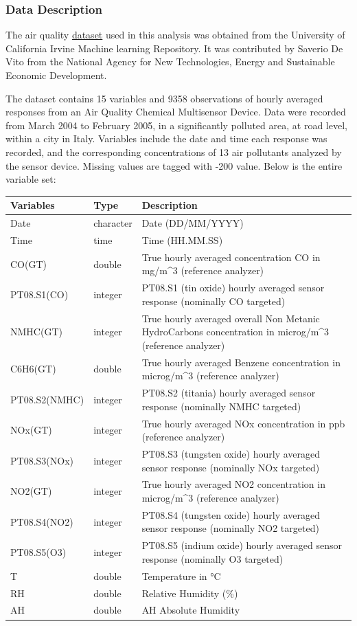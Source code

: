 \documentclass[]{article}
\begin{document}
\hypertarget{data-description}{%
\subsubsection{Data Description}\label{data-description}}

The air quality
\href{https://archive.ics.uci.edu/ml/datasets/Air+Quality}{dataset} used
in this analysis was obtained from the University of California Irvine
Machine learning Repository. It was contributed by Saverio De Vito from
the National Agency for New Technologies, Energy and Sustainable
Economic Development.

The dataset contains 15 variables and 9358 observations of hourly
averaged responses from an Air Quality Chemical Multisensor Device. Data
were recorded from March 2004 to February 2005, in a significantly
polluted area, at road level, within a city in Italy. Variables include
the date and time each response was recorded, and the corresponding
concentrations of 13 air pollutants analyzed by the sensor device.
Missing values are tagged with -200 value. Below is the entire variable
set:

\begin{longtable}[]{@{}lll@{}}
\toprule
Variables & Type & Description\tabularnewline
\midrule
\endhead
Date & character & Date (DD/MM/YYYY)\tabularnewline
Time & time & Time (HH.MM.SS)\tabularnewline
CO(GT) & double & True hourly averaged concentration CO in mg/m\^{}3
(reference analyzer)\tabularnewline
PT08.S1(CO) & integer & PT08.S1 (tin oxide) hourly averaged sensor
response (nominally CO targeted)\tabularnewline
NMHC(GT) & integer & True hourly averaged overall Non Metanic
HydroCarbons concentration in microg/m\^{}3 (reference
analyzer)\tabularnewline
C6H6(GT) & double & True hourly averaged Benzene concentration in
microg/m\^{}3 (reference analyzer)\tabularnewline
PT08.S2(NMHC) & integer & PT08.S2 (titania) hourly averaged sensor
response (nominally NMHC targeted)\tabularnewline
NOx(GT) & integer & True hourly averaged NOx concentration in ppb
(reference analyzer)\tabularnewline
PT08.S3(NOx) & integer & PT08.S3 (tungsten oxide) hourly averaged sensor
response (nominally NOx targeted)\tabularnewline
NO2(GT) & integer & True hourly averaged NO2 concentration in
microg/m\^{}3 (reference analyzer)\tabularnewline
PT08.S4(NO2) & integer & PT08.S4 (tungsten oxide) hourly averaged sensor
response (nominally NO2 targeted)\tabularnewline
PT08.S5(O3) & integer & PT08.S5 (indium oxide) hourly averaged sensor
response (nominally O3 targeted)\tabularnewline
T & double & Temperature in °C\tabularnewline
RH & double & Relative Humidity (\%)\tabularnewline
AH & double & AH Absolute Humidity\tabularnewline
\bottomrule
\end{longtable}
\end{document}
